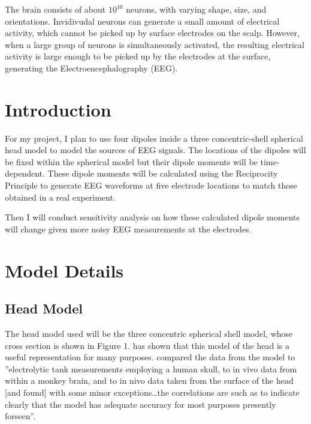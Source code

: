 \documentclass{article}
\author{Allen Yin}
\begin{document}
\maketitle
\setlength\parskip{0.1in}

The brain consists of about $10^{10}$ neurons, with varying shape, size, and orientations. Invidivudal neurons can generate a small amount of electrical activity, which cannot be picked up by surface electrodes on the scalp. However, when a large group of neurons is simultaneously activated, the resulting electrical activity is large enough to be picked up by the electrodes at the surface, generating the Electroencephalography (EEG).


\section{Introduction}
For my project, I plan to use four dipoles inside a three concentric-shell spherical head model to model the sources of EEG signals. The locations of the dipoles will be fixed within the spherical model but their dipole moments will be time-dependent. These dipole moments will be calculated using the Reciprocity Principle to generate EEG waveforms at five electrode locations to match those obtained in a real experiment.

Then I will conduct sensitivity analysis on how these calculated dipole moments will change given more noisy EEG measurements at the electrodes.

\section{Model Details}

\subsection{Head Model}
The head model used will be the three concentric spherical shell model, whose cross section is shown in Figure 1. \cite{RushDriscoll1} has shown that this model of the head is a useful representation for many purposes. \cite{RushDriscoll2} compared the data from the model to ''electrolytic tank measurements employing a human skull, to in vivo data from within a monkey brain, and to in nivo data taken from the surface of the head [and found] with some minor exceptions\ldots the correlations are such as to indicate clearly that the model has adequate accuracy for most purposes presently forseen''.
\end{document}
